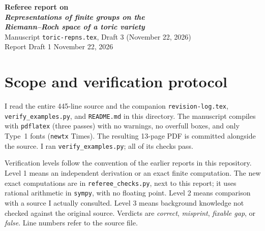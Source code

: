 \documentclass[12pt,letterpaper]{article}
\newcommand{\level}[1]{\textsf{Level #1}}
\begin{document}
\begin{center}
{\LARGE\bfseries Referee report on\\[3pt]
\emph{Representations of finite groups on the\\[2pt] Riemann--Roch space of a toric variety}}\\[6pt]
{\large Manuscript \texttt{toric-repns.tex}, Draft 3 (November 22, 2026)}\\[4pt]
{\large Report Draft 1 \textemdash{} November 22, 2026}
\end{center}

\begin{abstract}
This AI-aided referee report was prepared with Anthropic's Claude (Claude Opus 5.5); the verification level of each check is stated below, and this AI review is not an independent certification of the results.  The manuscript is a clear, well-organized expository synthesis, and nearly all of its formulas are correct: I rederived the orbit and character formulas, the fan and Cartier calculations, every number in the singular-surface example, the $S_3$ hexagon multiplicities, the Johnson-graph spectrum, and the weighted torus-normalizer trace.  I found one genuine mathematical error: the ``counterexample'' to the inverse problem in Section~10 does not answer the question as posed.  I also found a scope gap: Sections~7--8 apply the orbit theorem to polytopes that, in general, have no group-fixed lattice point, so the representation on sections depends on a choice of linearization that the paper should state.  Beyond these, there are two misprints, several citation repairs, and some readability items.  \textbf{Recommendation: minor revision.}  Items~1 and~2 of Section~\ref{sec:major} must be fixed; the rest are recommended.
\end{abstract}

\section{Scope and verification protocol}\label{sec:scope}
I read the entire 445-line source and the companion \texttt{revision-log.tex}, \texttt{verify\_examples.py}, and \texttt{README.md} in this directory.  The manuscript compiles with \texttt{pdflatex} (three passes) with no warnings, no overfull boxes, and only Type~1 fonts (\texttt{newtx} Times).  The resulting 13-page PDF is committed alongside the source.  I ran \texttt{verify\_examples.py}; all of its checks pass.

Verification levels follow the convention of the earlier reports in this repository.  \level{1} means an independent derivation or an exact finite computation.  The new exact computations are in \texttt{referee\_checks.py}, next to this report; it uses rational arithmetic in \texttt{sympy}, with no floating point.  \level{2} means comparison with a source I actually consulted.  \level{3} means background knowledge not checked against the original source.  Verdicts are \emph{correct}, \emph{misprint}, \emph{fixable gap}, or \emph{false}.  Line numbers refer to the source file.
\end{document}
